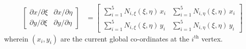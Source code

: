 \begin{subequations}
\begin{align}
	\begin{bmatrix}
	\partial x / \partial\xi & \partial x / \partial\eta \\
	\partial y / \partial\xi & \partial y / \partial\eta
	\end{bmatrix} & = 
	\begin{bmatrix}
	\sum\nolimits_{i=1}^5 N_{i,\xi} (\xi,\eta) \, x_i & \sum\nolimits_{i=1}^5 N_{i,\eta} (\xi,\eta) \, x_i \\
	\sum\nolimits_{i=1}^5 N_{i,\xi} (\xi,\eta) \, y_i & \sum\nolimits_{i=1}^5 N_{i,\eta} (\xi,\eta) \, y_i
	\end{bmatrix}
	\label{currentGradients}
	\end{align}
\end{subequations}
wherein $(x_i, y_i)$ are the current global co-ordinates at the $i^{\mathrm{th}}$ vertex.


